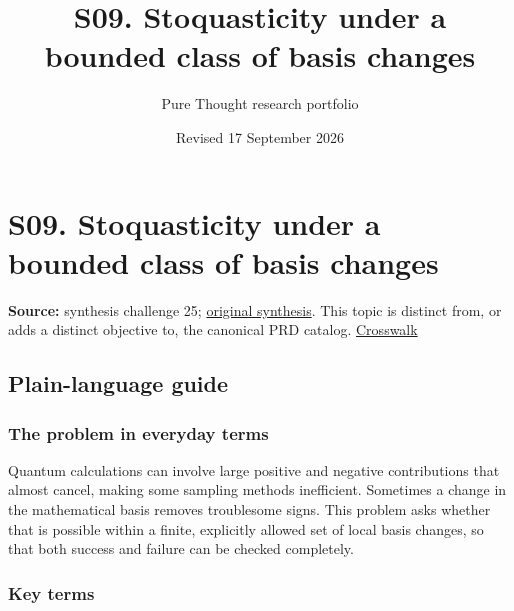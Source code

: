 \documentclass[
  11pt,
]{article}
\title{S09. Stoquasticity under a bounded class of basis changes}
\author{Pure Thought research portfolio}
\date{Revised 17 September 2026}
\begin{document}
\maketitle
\thispagestyle{empty}
\clearpage

\section{S09. Stoquasticity under a bounded class of basis changes}

\textbf{Source:} synthesis challenge 25;
\href{https://github.com/rick-stevens-ai/Pure-Thought/blob/main/NOTES/30-Most-Compelling-Pure-Thought-AI-Challenges.md}{original
synthesis}. This topic is distinct from, or adds a distinct objective
to, the canonical PRD catalog.
\href{https://github.com/rick-stevens-ai/Pure-Thought/blob/main/reviews/SYNTHESIS-CROSSWALK.md}{Crosswalk}

\subsection{Plain-language guide}

\subsubsection{The problem in everyday terms}

Quantum calculations can involve large positive and negative
contributions that almost cancel, making some sampling methods
inefficient. Sometimes a change in the mathematical basis removes
troublesome signs. This problem asks whether that is possible within a
finite, explicitly allowed set of local basis changes, so that both
success and failure can be checked completely.

\subsubsection{Key terms}
\end{document}
